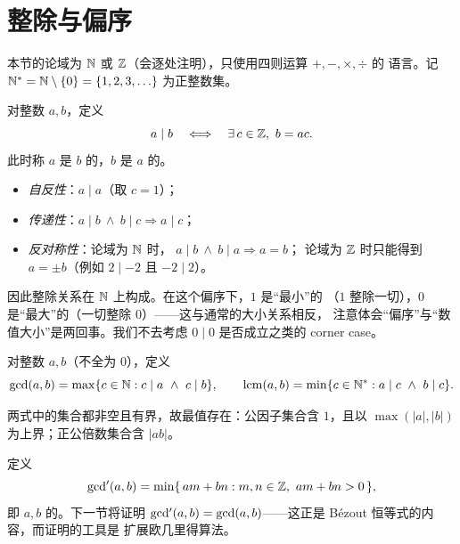 \section{整除与偏序}\label{sec:div}

本节的论域为 $\mathbb{N}$ 或 $\mathbb{Z}$（会逐处注明），只使用四则运算 $+,-,\times,\div$ 的
语言。记 $\mathbb{N}^{*}=\mathbb{N}\setminus\{0\}=\{1,2,3,\ldots\}$ 为正整数集。

\begin{definition}[整除]
对整数 $a,b$，定义
\[
  a\mid b \quad\Longleftrightarrow\quad \exists\, c\in\mathbb{Z},\ b=ac.
\]
此时称 $a$ 是 $b$ 的，$b$ 是 $a$ 的。
\end{definition}

\begin{itemize}[leftmargin=1.3em,itemsep=1pt]
  \item \emph{自反性}：$a\mid a$（取 $c=1$）；
  \item \emph{传递性}：$a\mid b\ \wedge\ b\mid c \Rightarrow a\mid c$；
  \item \emph{反对称性}：论域为 $\mathbb{N}$ 时，
        $a\mid b\ \wedge\ b\mid a \Rightarrow a=b$；
        论域为 $\mathbb{Z}$ 时只能得到 $a=\pm b$（例如 $2\mid-2$ 且 $-2\mid2$）。
\end{itemize}
因此整除关系在 $\mathbb{N}$ 上构成。在这个偏序下，$1$ 是“最小”的
（$1$ 整除一切），$0$ 是“最大”的（一切整除 $0$）——这与通常的大小关系相反，
注意体会“偏序”与“数值大小”是两回事。我们不去考虑 $0\mid 0$ 是否成立之类的
corner case。

\begin{definition}[最大公因数与最小公倍数]
对整数 $a,b$（不全为 $0$），定义
\[
  \gcd(a,b)=\max\{c\in\N : c\mid a\ \wedge\ c\mid b\},
  \qquad
  \lcm(a,b)=\min\{c\in\Ns : a\mid c\ \wedge\ b\mid c\}.
\]
\end{definition}

两式中的集合都非空且有界，故最值存在：公因子集合含 $1$，且以 $\max(|a|,|b|)$
为上界；正公倍数集合含 $|ab|$。

定义
\[
  \mathop{\mathrm{gcd'}}\nolimits(a,b)=\min\{\,am+bn : m,n\in\mathbb{Z},\ am+bn>0\,\},
\]
即 $a,b$ 的。下一节将证明
$\mathop{\mathrm{gcd'}}\nolimits(a,b)=\gcd(a,b)$——这正是 Bézout 恒等式的内容，而证明的工具是
扩展欧几里得算法。
